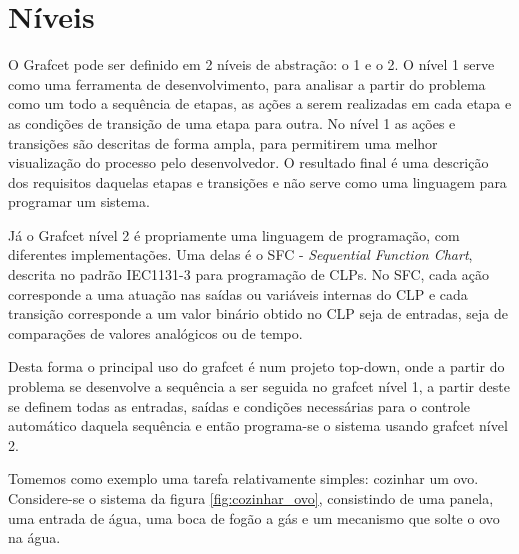 \clearpage
\section{Níveis}
O Grafcet pode ser definido em 2 níveis de abstração: o 1 e o 2. O nível 1 serve como uma ferramenta de desenvolvimento, para analisar a partir do problema como um todo a sequência de etapas, as ações a serem realizadas em cada etapa e as condições de transição de uma etapa para outra. No nível 1 as ações e transições são descritas de forma ampla, para permitirem uma melhor visualização do processo pelo desenvolvedor. O resultado final é uma descrição dos requisitos daquelas etapas e transições e não serve como uma linguagem para programar um sistema.

Já o Grafcet nível 2 é propriamente uma linguagem de programação, com diferentes implementações. Uma delas é o SFC - \emph{Sequential Function Chart}, descrita no padrão IEC1131-3 para programação de CLPs. No SFC, cada ação corresponde a uma atuação nas saídas ou variáveis internas do CLP e cada transição corresponde a um valor binário obtido no CLP seja de entradas, seja de comparações de valores analógicos ou de tempo.

Desta forma o principal uso do grafcet é num projeto top-down, onde a partir do problema se desenvolve a sequência a ser seguida no grafcet nível 1, a partir deste se definem todas as entradas, saídas e condições necessárias para o controle automático daquela sequência e então programa-se o sistema usando grafcet nível 2.

Tomemos como exemplo uma tarefa relativamente simples: cozinhar um ovo. Considere-se o sistema da figura \ref{fig:cozinhar_ovo}, consistindo de uma panela, uma entrada de água, uma boca de fogão a gás e um mecanismo que solte o ovo na água.


